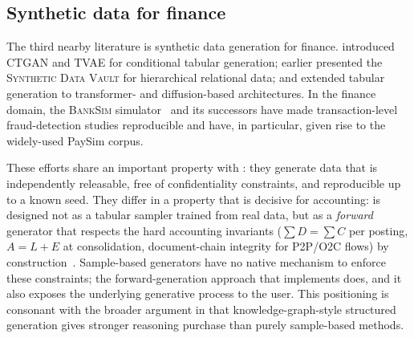 \subsection{Synthetic data for finance}
\label{sec:related-work:synth-finance}

The third nearby literature is synthetic data generation for finance.
\citet{xu2019modeling} introduced \textsc{CTGAN} and \textsc{TVAE} for
conditional tabular generation; \citet{patki2016synthetic} earlier
presented the \textsc{Synthetic Data Vault} for hierarchical relational
data; \citet{solatorio2023realtabformer} and
\citet{kotelnikov2023tabddpm} extended tabular generation to
transformer- and diffusion-based architectures.  In the finance
domain, the \textsc{BankSim} simulator~\citep{lopez2016banksim} and
its successors have made transaction-level fraud-detection studies
reproducible and have, in particular, given rise to the widely-used
PaySim corpus.

These efforts share an important property with \bench{}: they
generate data that is independently releasable, free of confidentiality
constraints, and reproducible up to a known seed.  They differ in a
property that is decisive for accounting: \bench{} is designed not as
a tabular sampler trained from real data, but as a \emph{forward}
generator that respects the hard accounting invariants
($\sum D = \sum C$ per posting, $A = L + E$ at consolidation,
document-chain integrity for P2P/O2C flows) by
construction~\citep{ivertowski2026datasynth}.  Sample-based generators
have no native mechanism to enforce these constraints; the
forward-generation approach that \system{} implements does, and it
also exposes the underlying generative process to the user.  This
positioning is consonant with the broader argument in
\citet{cambria2021kg} that knowledge-graph-style structured generation
gives stronger reasoning purchase than purely sample-based methods.
